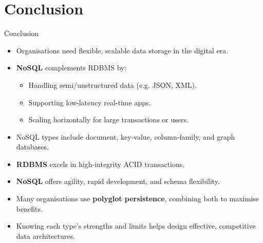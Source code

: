 \documentclass[aspectratio=169, table]{beamer}
\begin{document}
\section{Conclusion}

\begin{frame}{Conclusion}
	\vspace{20pt}
	
	\begin{itemize}
		\item Organisations need flexible, scalable data storage in the digital era.
		\item \textbf{NoSQL} complements RDBMS by:
		\begin{itemize}
			\item Handling semi/unstructured data (e.g. JSON, XML).
			\item Supporting low-latency real-time apps.
			\item Scaling horizontally for large transactions or users.
		\end{itemize}
		\item NoSQL types include document, key-value, column-family, and graph databases.
		\item \textbf{RDBMS} excels in high-integrity ACID transactions.
		\item \textbf{NoSQL} offers agility, rapid development, and schema flexibility.
		\item Many organisations use \textbf{polyglot persistence}, combining both to maximise benefits.
		\item Knowing each type’s strengths and limits helps design effective, competitive data architectures.
	\end{itemize}
	
\end{frame}
\end{document}
